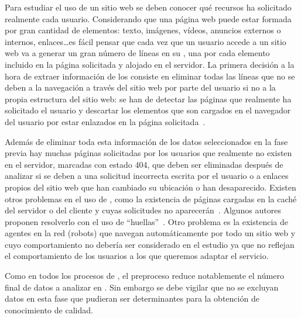 Para estudiar el uso de un sitio web se deben conocer qué recursos ha solicitado realmente cada usuario. Considerando que una página web puede estar formada por gran cantidad de elementos: texto, imágenes, vídeos, anuncios externos o internos, enlaces\ldots es fácil pensar que cada vez que un usuario accede a un sitio web va a generar un gran número de líneas en su \flog, una por cada elemento incluido en la página solicitada y alojado en el servidor. La primera decisión a la hora de extraer información de los \flogs consiste en eliminar todas las líneas que no se deben a la navegación a través del sitio web por parte del usuario si no a la propia estructura del sitio web: se han de detectar las páginas que realmente ha solicitado el usuario y descartar los elementos que son cargados en el navegador del usuario por estar enlazados en la página solicitada~\citep{CooleyMobasherSrivastava-DataPreparationForMiningWWWBrowsingPatterns-1999}.

Además de eliminar toda esta información de los datos seleccionados en la fase previa hay muchas páginas solicitadas por los usuarios que realmente no existen en el servidor, marcadas con estado 404, que deben ser eliminadas después de analizar si se deben a una solicitud incorrecta escrita por el usuario o a enlaces propios del sitio web que han cambiado su ubicación o han desaparecido. Existen otros problemas en el uso de \flogs, como la existencia de páginas cargadas en la caché del servidor o del cliente y cuyas solicitudes no aparecerán~\citep{Pitkow-InSearchOfReliableUsageDataWWW-1997}. Algunos autores proponen resolverlo con el uso de "`huellas"'~\citep{VillenaGonzalezBarceloVelasco-MUWMedianteHuellasYSesiones-2002}. Otro problema es la existencia de agentes en la red (robots) que navegan automáticamente por todo un sitio web y cuyo comportamiento no debería ser considerado en el estudio ya que no reflejan el comportamiento de los usuarios a los que queremos adaptar el servicio.

Como en todos los procesos de \KDD, el preproceso reduce notablemente el número final de datos a analizar en \WUM. Sin embargo se debe vigilar que no se excluyan datos en esta fase que pudieran ser determinantes para la obtención de conocimiento de calidad.
